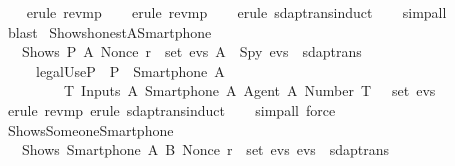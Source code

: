 \begin{isabellebody}
  \isadelimproof
  \isanewline
  \ \ %
  \endisadelimproof
  \isatagproof
  \isamarkupfalse%
  \ {\isacharparenleft}erule\ rev{\isacharunderscore}mp{\isacharparenright}\isanewline
  \ \ \isamarkupfalse%
  \ {\isacharparenleft}erule\ rev{\isacharunderscore}mp{\isacharparenright}\isanewline
  \ \ \isamarkupfalse%
  \ {\isacharparenleft}erule\ sdaptrans{\isachardot}induct{\isacharparenright}\isanewline
  \ \ \isamarkupfalse%
  \ {\isacharparenleft}simp{\isacharunderscore}all{\isacharparenright}\isanewline
  \ \ \isamarkupfalse%
  \ {\isacharparenleft}blast{\isacharplus}{\isacharparenright}\isanewline
  \isamarkupfalse%
  \endisatagproof
  {\isafoldproof}%
  \isadelimproof
  \isanewline
  \endisadelimproof
  \isanewline
  \isamarkupfalse%
  \ Shows{\isacharunderscore}honest{\isacharunderscore}A{\isacharunderscore}Smartphone{\isacharunderscore}{}\ {\isacharcolon}\isanewline
  \ \ {\isachardoublequoteopen}{\isasymlbrakk}\ Shows\ P\ A\ {\isacharparenleft}Nonce\ r{\isacharparenright}\ {\isasymin}\ set\ evs{\isacharsemicolon}\ A\ {\isasymnoteq}\ Spy{\isacharsemicolon}\ evs\ {\isasymin}\ sdaptrans\ {\isasymrbrakk}\isanewline
  \ \ \ \ {\isasymLongrightarrow}\ {\isacharparenleft}legalUse{\isacharparenleft}P{\isacharparenright}{\isacharparenright}\ {\isasymand}\ P\ {\isacharequal}\ {\isacharparenleft}Smartphone\ A{\isacharparenright}\ {\isasymand}\isanewline
  \ \ \ \ \ \ \ \ {\isacharparenleft}{\isasymexists}\ T{\isachardot}\ Inputs\ A\ {\isacharparenleft}Smartphone\ A{\isacharparenright}\ {\isasymlbrace}Agent\ A{\isacharcomma}\ Number\ T\ {\isasymrbrace}\ {\isasymin}\ set\ evs{\isacharparenright}{\isachardoublequoteclose}\isanewline
  \isadelimproof
  \isanewline
  \ \ %
  \endisadelimproof
  \isatagproof
  \isamarkupfalse%
  \ {\isacharparenleft}erule\ rev{\isacharunderscore}mp{\isacharcomma}\ erule\ sdaptrans{\isachardot}induct{\isacharparenright}\isanewline
  \ \ \isamarkupfalse%
  \ {\isacharparenleft}simp{\isacharunderscore}all{\isacharcomma}\ force{\isacharplus}{\isacharparenright}\isanewline
  \isamarkupfalse%
  \endisatagproof
  {\isafoldproof}%
  \isadelimproof
  \isanewline
  \endisadelimproof
  \isanewline
  \isamarkupfalse%
  \ Shows{\isacharunderscore}Someone{\isacharunderscore}Smartphone{\isacharunderscore}{}\ {\isacharcolon}\isanewline
  \ \ {\isachardoublequoteopen}{\isasymlbrakk}\ Shows\ {\isacharparenleft}Smartphone\ A{\isacharparenright}\ B\ {\isacharparenleft}Nonce\ r{\isacharparenright}\ {\isasymin}\ set\ evs{\isacharsemicolon}\ evs\ {\isasymin}\ sdaptrans\ {\isasymrbrakk}\isanewline

\end{isabellebody}
